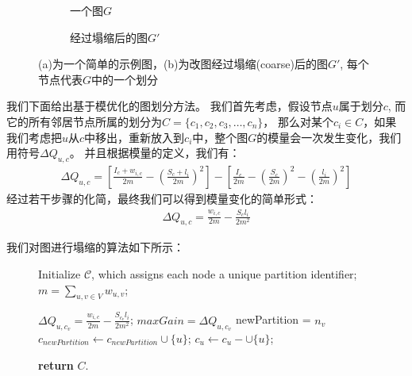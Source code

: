 \documentclass[master]{njuthesis}
\begin{document}
\begin{figure}[t]
    \centering
    \begin{subfigure}[b]{0.48\linewidth}        %
        \centering
        \label{fig:two:one}
	\resizebox{!}{!}{}
	\caption{一个图$G$　}
	\label{fig:figure2:figure1} 
	\end{subfigure}
    \begin{subfigure}[b]{0.48\linewidth}        %
     \centering
	\resizebox{!}{!}{}
	\caption{经过塌缩后的图$G\prime$}
	\label{fig:figure2:figure2}
    \end{subfigure}
    \caption{(a)为一个简单的示例图，(b)为改图经过塌缩(coarse)后的图$G\prime$, 每个节点代表$G$中的一个划分}
    \label{fig:two}
\end{figure}
我们下面给出基于模优化的图划分方法。
我们首先考虑，假设节点$u$属于划分$c$, 而它的所有邻居节点所属的划分为$C = \{c_1, c_2, c_3, \dots, c_n \}$，
那么对某个$c_i \in C$，如果我们考虑把$u$从$c$中移出，重新放入到$c_i$中，整个图$G$的模量会一次发生变化，我们用符号$\Delta Q_{u,c}$。
并且根据模量的定义，我们有：
\begin{equation}
\begin{aligned}
 \Delta Q_{u,c}=\left[ \frac{I_c+w_{i,c}}{2m} - {\left(\frac{S_c + l_i}{2m} \right)}^2 \right] -
 \left[ \frac{I_c}{2m} - {\left(\frac{S_c}{2m} \right)}^2 - {\left(\frac{l_i}{2m}\right)}^2 \right]
\end{aligned}
\end{equation}
经过若干步骤的化简，最终我们可以得到模量变化的简单形式：
\begin{equation}
\begin{aligned}
 \Delta Q_{u,c}=\frac{w_{i,c}}{2m} - \frac{S_cl_i}{2m^2} 
\end{aligned}
\end{equation}

我们对图进行塌缩的算法如下所示：
\begin{figure}
\begin{algorithm}[H]
\label{alg:mlgp}
\begin{algorithmic}[1]
	    \State Initialize $\mathcal{C}$, which assigns each node a unique partition identifier;
	    \State $m=\sum\nolimits_{u,v \in V} w_{u,v}$;
		
		     \State $\Delta Q_{u,c_{v}}=\frac{w_{i,c}}{2m} - \frac{S_{c_v}l_i}{2m^2}$;
		      \State $maxGain = \Delta Q_{u,c_{v}}$
		      \State newPartition = $n_v$
		     \EndIf
		\EndFor
		    \State $c_{newPartition} \gets c_{newPartition}\cup\{u\}$;
		    \State $c_{u} \gets c_{u} - \cup\{u\}$;
		\EndIf	
	    
	    \EndFor
	\EndWhile
\State \textbf{return} $C$.
\EndProcedure
\end{algorithmic}
\end{algorithm}
\end{figure}
\end{document}
